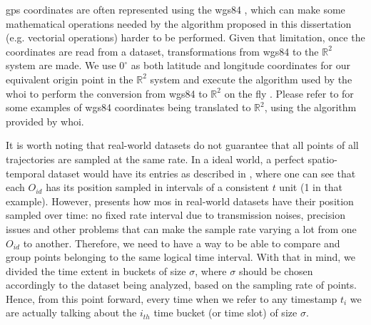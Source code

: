 \ac{gps} coordinates are often represented using the \ac{wgs84} \citep{wgs84}, which can make some mathematical
operations needed by the algorithm proposed in this dissertation (e.g. vectorial operations) harder to be performed.
Given that limitation, once the coordinates are read from a dataset, transformations from \ac{wgs84} to the
$\mathbb{R}^2$ system are made. We use $0^\circ$ as both latitude and longitude coordinates for our equivalent origin
point in the $\mathbb{R}^2$ system and execute the algorithm used by the \ac{whoi} to perform the conversion from
\ac{wgs84} to $\mathbb{R}^2$ on the fly \citep{latlogtoxy}. Please refer to  for some examples
of \ac{wgs84} coordinates being translated to $\mathbb{R}^2$, using the algorithm provided by \ac{whoi}.

It is worth noting that real-world datasets do not guarantee that all points of all trajectories are sampled at the same
rate. In a ideal world, a perfect spatio-temporal dataset would have its entries as described in
, where one can see that each $O_{id}$ has its position sampled in intervals of a consistent $t$
unit (1 in that example). However,  presents how \acp{mo} in real-world datasets have their
position sampled over time: no fixed rate interval due to transmission noises, precision issues and other problems that
can make the sample rate varying a lot from one $O_{id}$ to another. Therefore, we need to have a way to be able to
compare and group points belonging to the same logical time interval. With that in mind, we divided the time extent in
buckets of size $\sigma$, where $\sigma$ should be chosen accordingly to the dataset being analyzed, based on the
sampling rate of points. Hence, from this point forward, every time when we refer to any timestamp $t_i$ we are actually
talking about the $i_{th}$ time bucket (or time slot) of size $\sigma$.

